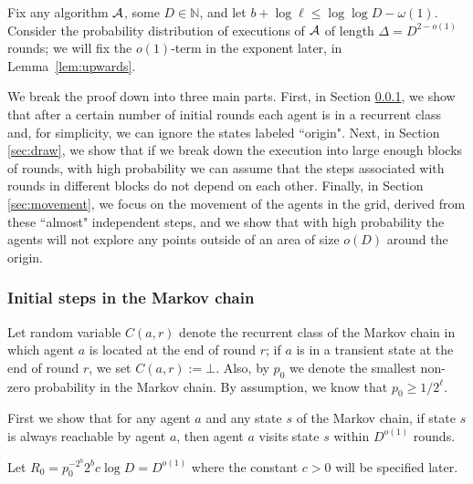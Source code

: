 \documentclass[11pt]{article}
\newcommand{\N}{\mathbb{N}}
\begin{document}
Fix any algorithm ${\cal A}$, some $D \in \N$, and let $b + \log \ell \leq \log \log D-\omega(1)$. Consider the probability distribution of executions of ${\cal A}$ of length $\Delta=D^{2-o(1)}$ rounds; we will fix the $o(1)$-term in the exponent later, in Lemma~\ref{lem:upwards}. 

We break the proof down into three main parts. First, in Section \ref{sec:initial}, we show that after a certain number of initial rounds each agent is in a recurrent class and, for simplicity, we can ignore the states labeled ``origin". Next, in Section \ref{sec:draw}, we show that if we break down the execution into large enough blocks of rounds, with high probability  we can assume that the steps associated with rounds in different blocks do not depend on each other. Finally, in Section \ref{sec:movement}, we focus on the movement of the agents in the grid, derived from these ``almost" independent steps, and we show that with high probability the agents will not explore any points outside of an area of size $o(D)$ around the origin.


\subsubsection{Initial steps in the Markov chain}
\label{sec:initial}

Let random variable $C(a,r)$ denote the recurrent class of the Markov chain in which agent $a$ is located at the end of round $r$; if $a$ is in a transient state at the end of round $r$, we set $C(a,r):=\bot$. Also, by $p_0$ we denote the smallest non-zero probability in the Markov chain. By assumption, we know that $p_0 \geq 1/2^\ell$.

First we show that for any agent $a$ and any state $s$ of the Markov chain, if state $s$ is always reachable by agent $a$, then agent $a$ visits state $s$ within $D^{o(1)}$ rounds.

Let $R_0 = p_0^{-2^b}2^b c\log D = D^{o(1)}$ where the constant $c>0$ will be specified later.
\end{document}
